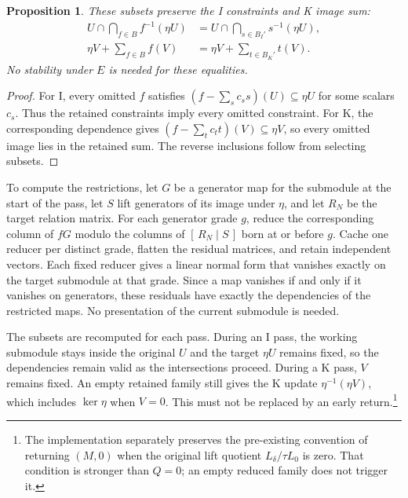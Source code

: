\documentclass[11pt,a4paper]{article}
\newtheorem{proposition}{Proposition}
\begin{document}
\begin{proposition}
These subsets preserve the I constraints and K image sum:
\begin{align*}
 U\cap\bigcap_{f\in B}f^{-1}(\eta U)
 &=U\cap\bigcap_{s\in B_I'}s^{-1}(\eta U),\\
 \eta V+\sum_{f\in B}f(V)&=\eta V+\sum_{t\in B_K'}t(V).
\end{align*}
No stability under $E$ is needed for these equalities.
\end{proposition}
\begin{proof}
For I, every omitted $f$ satisfies
$(f-\sum_s c_ss)(U)\subseteq\eta U$ for some scalars $c_s$.
Thus the retained constraints imply every omitted constraint.
For K, the corresponding dependence gives
$(f-\sum_t c_tt)(V)\subseteq\eta V$, so every omitted image lies
in the retained sum. The reverse inclusions follow from selecting subsets.
\end{proof}

To compute the restrictions, let $G$ be a generator map for the submodule
at the start of the pass, let $S$ lift generators of its image under
$\eta$, and let $R_N$ be the target relation matrix. For each generator
grade $g$, reduce the corresponding column
of $fG$ modulo the columns of $[\,R_N\mid S\,]$ born at or before $g$.
Cache one reducer per distinct grade, flatten the residual matrices, and
retain independent vectors. Each fixed reducer gives a linear normal form
that vanishes exactly on the target submodule at that grade. Since a map
vanishes if and only if it vanishes on generators, these residuals have
exactly the dependencies of the restricted maps. No presentation of the
current submodule is needed.

The subsets are recomputed for each pass. During an I pass, the working
submodule stays inside the original $U$ and the target $\eta U$ remains
fixed, so the dependencies remain valid as the intersections proceed.
During a K pass, $V$ remains fixed. An empty retained family still gives
the K update $\eta^{-1}(\eta V)$, which includes $\ker\eta$ when $V=0$.
This must not be replaced by an early return.\footnote{The implementation
separately preserves the pre-existing convention of returning $(M,0)$
when the original lift quotient $L_\delta/\tau L_0$ is zero. That
condition is stronger than $Q=0$; an empty reduced family does not
trigger it.}
\end{document}
